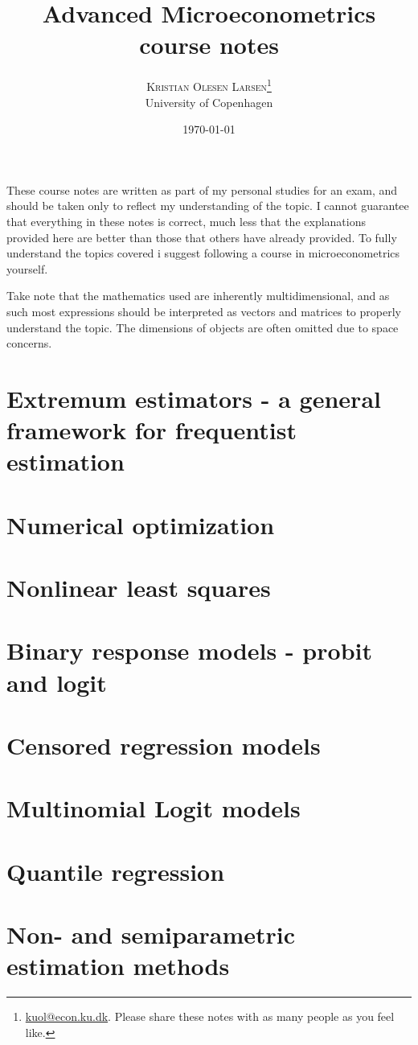\documentclass[twoside,twocolumn]{article}
\title{Advanced Microeconometrics \\ \Large course notes} %
\author{%
\textsc{Kristian Olesen Larsen}\thanks{\href{mailto:kuol@econ.ku.dk}{kuol@econ.ku.dk}. Please share these notes with as many people as you feel like.} \\[1ex] %
\normalsize University of Copenhagen %
}
\date{\today} %
\begin{document}
\maketitle


These course notes are written as part of my personal studies for an exam, and should be taken only to reflect my understanding of the topic. I cannot guarantee that everything in these notes is correct, much less that the explanations provided here are better than those that others have already provided. To fully understand the topics covered i suggest following a course in microeconometrics yourself.

Take note that the mathematics used are inherently multidimensional, and as such most expressions should be interpreted as vectors and matrices to properly understand the topic. The dimensions of objects are often omitted due to space concerns.

\tableofcontents

\section{Extremum estimators - a general framework for frequentist estimation}


\section{Numerical optimization}


\section{Nonlinear least squares}



\section{Binary response models - probit and logit}


\section{Censored regression models}



\section{Multinomial Logit models}



\section{Quantile regression}


\section{Non- and semiparametric estimation methods}

\end{document}
